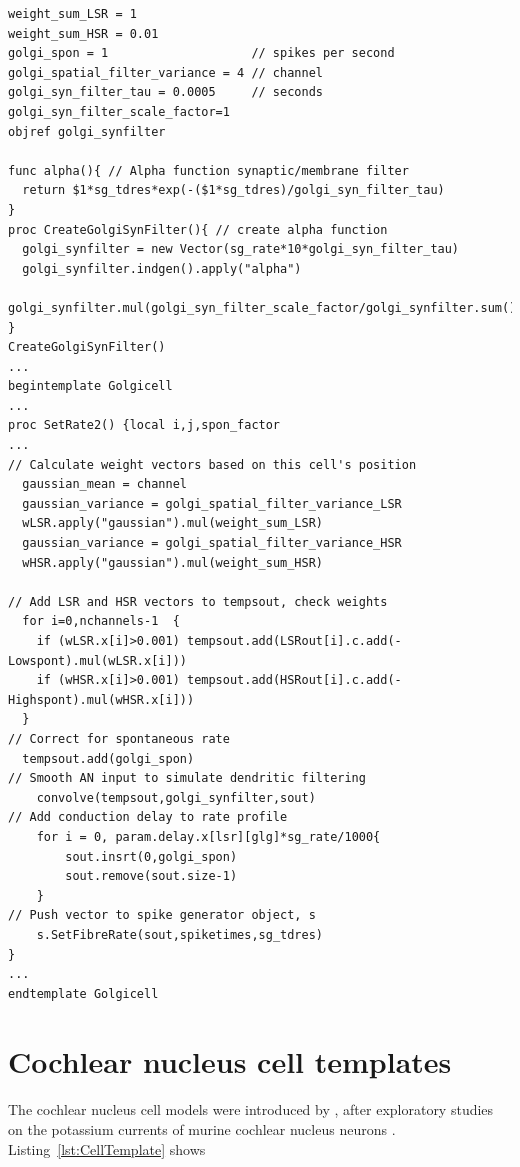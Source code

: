  \begin{lstlisting}[label=GolgiTemplate,caption=Create golgi cell rate vector
   within Golgi template (in CNcell.tem)]
weight_sum_LSR = 1
weight_sum_HSR = 0.01
golgi_spon = 1                    // spikes per second
golgi_spatial_filter_variance = 4 // channel 
golgi_syn_filter_tau = 0.0005     // seconds 
golgi_syn_filter_scale_factor=1
objref golgi_synfilter

func alpha(){ // Alpha function synaptic/membrane filter 
  return $1*sg_tdres*exp(-($1*sg_tdres)/golgi_syn_filter_tau)
}
proc CreateGolgiSynFilter(){ // create alpha function 
  golgi_synfilter = new Vector(sg_rate*10*golgi_syn_filter_tau)
  golgi_synfilter.indgen().apply("alpha")  
  golgi_synfilter.mul(golgi_syn_filter_scale_factor/golgi_synfilter.sum()) 
}
CreateGolgiSynFilter()
...
begintemplate Golgicell
...
proc SetRate2() {local i,j,spon_factor
...
// Calculate weight vectors based on this cell's position 
  gaussian_mean = channel
  gaussian_variance = golgi_spatial_filter_variance_LSR
  wLSR.apply("gaussian").mul(weight_sum_LSR)
  gaussian_variance = golgi_spatial_filter_variance_HSR
  wHSR.apply("gaussian").mul(weight_sum_HSR)

// Add LSR and HSR vectors to tempsout, check weights 
  for i=0,nchannels-1  {
    if (wLSR.x[i]>0.001) tempsout.add(LSRout[i].c.add(-Lowspont).mul(wLSR.x[i]))
    if (wHSR.x[i]>0.001) tempsout.add(HSRout[i].c.add(-Highspont).mul(wHSR.x[i]))
  }
// Correct for spontaneous rate 
  tempsout.add(golgi_spon)
// Smooth AN input to simulate dendritic filtering 
    convolve(tempsout,golgi_synfilter,sout)
// Add conduction delay to rate profile 
    for i = 0, param.delay.x[lsr][glg]*sg_rate/1000{
        sout.insrt(0,golgi_spon)
        sout.remove(sout.size-1)
    }
// Push vector to spike generator object, s 
    s.SetFibreRate(sout,spiketimes,sg_tdres)
}
...
endtemplate Golgicell
\end{lstlisting}


\section{Cochlear nucleus cell templates}

The cochlear nucleus cell models were introduced by \citet{RothmanManis:2003b},
after exploratory studies on the potassium currents of murine cochlear nucleus
neurons
\citep{RothmanManis:2003,RothmanManis:2003a}. Listing~\ref{lst:CellTemplate}
shows

